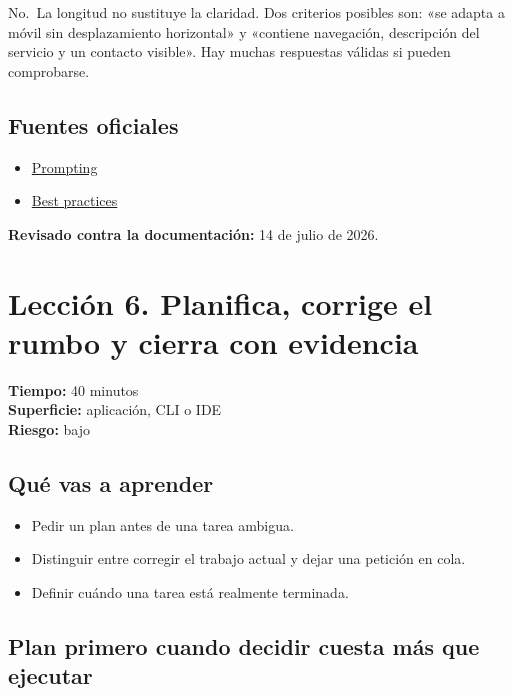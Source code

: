\documentclass[10pt,a4paper,openany]{book}
\providecommand{\tightlist}{\setlength{\itemsep}{0.18em}\setlength{\parskip}{0pt}}
\begin{document}
No.~La longitud no sustituye la claridad. Dos criterios posibles son:
«se adapta a móvil sin desplazamiento horizontal» y «contiene
navegación, descripción del servicio y un contacto visible». Hay muchas
respuestas válidas si pueden comprobarse.

\subsection{Fuentes oficiales}\label{fuentes-oficiales-4}

\begin{itemize}
\tightlist
\item
  \href{https://learn.chatgpt.com/docs/prompting}{Prompting}
\item
  \href{https://learn.chatgpt.com/guides/best-practices}{Best practices}
\end{itemize}

\textbf{Revisado contra la documentación:} 14 de julio de 2026.

\clearpage

\section{Lección 6. Planifica, corrige el rumbo y cierra con
evidencia}\label{lecciuxf3n-6.-planifica-corrige-el-rumbo-y-cierra-con-evidencia}

\begin{metabox}

\textbf{Tiempo:} 40 minutos\\
\textbf{Superficie:} aplicación, CLI o IDE\\
\textbf{Riesgo:} bajo

\end{metabox}

\subsection{Qué vas a aprender}\label{quuxe9-vas-a-aprender-5}

\begin{itemize}
\tightlist
\item
  Pedir un plan antes de una tarea ambigua.
\item
  Distinguir entre corregir el trabajo actual y dejar una petición en
  cola.
\item
  Definir cuándo una tarea está realmente terminada.
\end{itemize}

\subsection{Plan primero cuando decidir cuesta más que
ejecutar}\label{plan-primero-cuando-decidir-cuesta-muxe1s-que-ejecutar}
\end{document}
